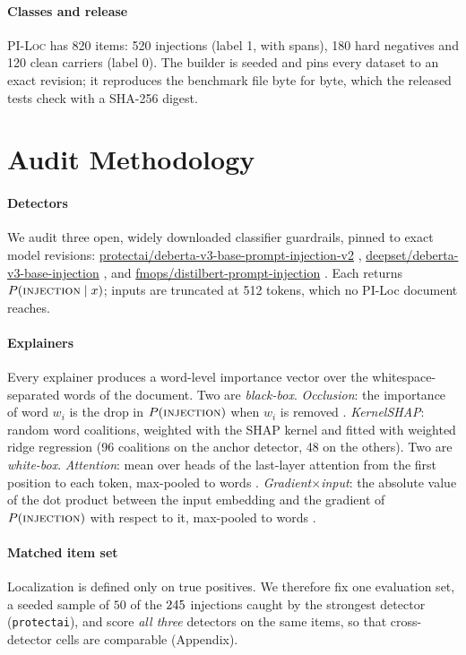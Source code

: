 \documentclass{ieeeaccess}
\begin{document}
\paragraph*{Classes and release}
\textsc{PI-Loc} has 820 items: 520 injections (label 1, with spans), 180 hard negatives and 120 clean carriers (label 0). The builder is seeded and pins every dataset to an exact revision; it reproduces the benchmark file byte for byte, which the released tests check with a SHA-256 digest.

\section{Audit Methodology}
\label{sec:method}

\paragraph*{Detectors}
We audit three open, widely downloaded classifier guardrails, pinned to exact model revisions: \url{protectai/deberta-v3-base-prompt-injection-v2} \cite{protectai2024}, \url{deepset/deberta-v3-base-injection} \cite{deepsetpi}, and \url{fmops/distilbert-prompt-injection} \cite{fmops}. Each returns $P(\textsc{injection}\mid x)$; inputs are truncated at 512 tokens, which no PI-Loc document reaches.

\paragraph*{Explainers}
Every explainer produces a word-level importance vector over the whitespace-separated words of the document. Two are \emph{black-box}. \emph{Occlusion}: the importance of word $w_i$ is the drop in $P(\textsc{injection})$ when $w_i$ is removed \cite{zeiler2014}. \emph{KernelSHAP}: random word coalitions, weighted with the SHAP kernel and fitted with weighted ridge regression \cite{shap2017} (96 coalitions on the anchor detector, 48 on the others). Two are \emph{white-box}. \emph{Attention}: mean over heads of the last-layer attention from the first position to each token, max-pooled to words \cite{attention2017}. \emph{Gradient$\times$input}: the absolute value of the dot product between the input embedding and the gradient of $P(\textsc{injection})$ with respect to it, max-pooled to words \cite{sundararajan2017}.

\paragraph*{Matched item set}
Localization is defined only on true positives. We therefore fix one evaluation set, a seeded sample of $50$ of the $245$ injections caught by the strongest detector (\texttt{protectai}), and score \emph{all three} detectors on the same items, so that cross-detector cells are comparable (Appendix).
\end{document}
